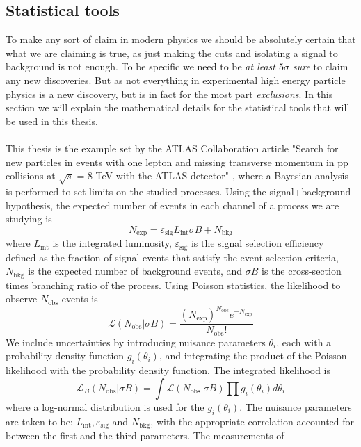 \documentclass[12pt, a4paper]{book}
\begin{document}
\subsection{Statistical tools}\label{sec:stat_anal}
To make any sort of claim in modern physics we should be absolutely certain that what we are claiming is true, as just making the cuts and isolating a signal to background is not enough. To be specific we need to be \textit{at least $5\sigma$ sure} to claim any new discoveries. 
But as not everything in experimental high energy particle physics is a new discovery, but is in fact for the most part \textit{exclusions}. In this section we will explain the mathematical details for the statistical tools that will be used in this thesis.\\ 
\\This thesis is the example set by the ATLAS Collaboration article "Search for new particles in events with one lepton and missing transverse momentum in pp collisions at $\sqrt s$ = 8 TeV with the ATLAS detector" \cite{Stat},
where a Bayesian analysis is performed to set limits on the studied processes. Using the signal+background hypothesis, the expected number of events in each channel of a process we are studying is 
$$
    N_{\text{exp}} = \varepsilon_{\text{sig}}L_{\text{int}}\sigma B + N_{\text{bkg}}
$$
where $L_{\text{int}}$ is the integrated luminosity, $\varepsilon_{\text{sig}}$ is the signal selection efficiency defined as the fraction of signal events that satisfy the event selection criteria, $N_{\text{bkg}}$ is the expected number of background events, and $\sigma B$ is the 
cross-section times branching ratio of the process. Using Poisson statistics, the likelihood to observe $N_{\text{obs}}$ events is
\begin{equation}\label{eq:observed_events_prob}
    \mathcal{L}(N_{\text{obs}}\vert \sigma B) = \frac{(N_{\text{exp}})^{N_{\text{obs}}}e^{-N_{\text{exp}}}}{N_{\text{obs}}!}
\end{equation}
We include uncertainties by introducing nuisance parameters $\theta_i$, each with a probability density function $g_i(\theta_i)$, and integrating the product of the Poisson likelihood with the probability density function. The integrated likelihood is
\begin{equation}\label{eq:observed_events_nuisance}
    \mathcal{L}_B(N_{\text{obs}}\vert \sigma B)=\int\mathcal{L}(N_{\text{obs}}\vert \sigma B)\prod g_i(\theta_i)d\theta_i
\end{equation}
where a log-normal distribution is used for the $g_i(\theta_i)$. The nuisance parameters are taken to be: $L_{\text{int}}, \varepsilon_{\text{sig}}$ and $N_{\text{bkg}}$, with the appropriate correlation accounted for between the first and the third parameters. The measurements of 
\end{document}
